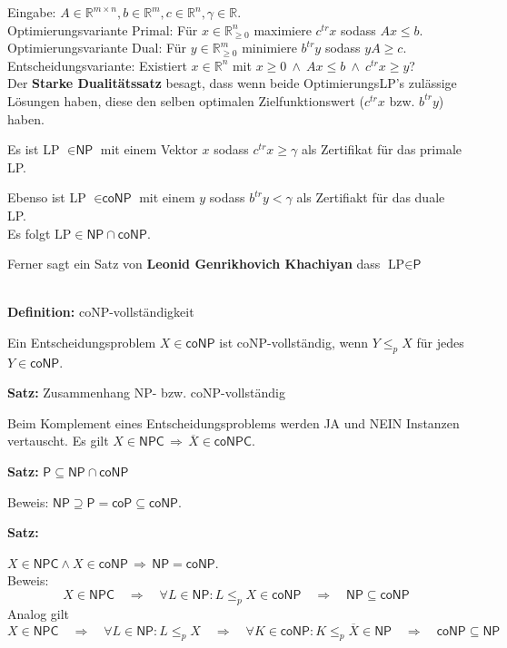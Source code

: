 \documentclass[a4paper,graphics,11pt]{article}
\begin{document}
Eingabe: $A \in \mathbb{R}^{m \times n}, b \in \mathbb{R}^m, c \in \mathbb{R}^n, \gamma \in \mathbb{R}$.
\\[10pt]
Optimierungsvariante Primal: Für $x \in \mathbb{R}^n_{\geq 0}$ maximiere $c^{tr}x$ sodass $Ax \leq b$.
\\[10pt]
Optimierungsvariante Dual: Für $y \in \mathbb{R}^m_{\geq 0}$ minimiere $b^{tr}y$ sodass $yA \geq c$.
\\[10pt]
Entscheidungsvariante: Existiert $x \in \mathbb{R}^n$ mit $x \geq 0\ \land\ Ax \leq b\ \land\ c^{tr}x \geq y$?
\\[30pt]
Der \textbf{Starke Dualitätssatz} besagt, dass wenn beide OptimierungsLP's zulässige Lösungen haben,
diese den selben optimalen Zielfunktionswert ($c^{tr}x$ bzw. $b^{tr}y$) haben.

Es ist LP $\in \textsf{NP}$ mit einem Vektor $x$ sodass $c^{tr}x \geq \gamma$ als Zertifikat für das primale LP.

Ebenso ist LP $\in \textsf{coNP}$ mit einem $y$ sodass $b^{tr}y < \gamma$ als Zertifiakt für das duale LP.
\\[30pt]
Es folgt $\text{LP} \in \textsf{NP} \cap \textsf{coNP}$.

Ferner sagt ein Satz von \textbf{Leonid Genrikhovich Khachiyan} dass $\text{LP} \in \textsf{P}$

\strut\\

\textbf{Definition:} \textsf{coNP}-vollständigkeit

Ein Entscheidungsproblem $X \in \textsf{coNP}$ ist \textsf{coNP}-vollständig, wenn $Y \leq_p X$ für jedes
$Y \in \textsf{coNP}$.

\strut

\textbf{Satz:} Zusammenhang \textsf{NP}- bzw. \textsf{coNP}-vollständig

Beim Komplement eines Entscheidungsproblems werden JA und NEIN Instanzen vertauscht.
Es gilt $X \in \textsf{NPC} \,\Longrightarrow\, \overline{X} \in \textsf{coNPC}$.

\strut

\textbf{Satz:} $\textsf{P} \subseteq \textsf{NP} \cap \textsf{coNP}$

Beweis: $\textsf{NP} \supseteq \textsf{P} = \textsf{coP} \subseteq \textsf{coNP}$.

\strut

\textbf{Satz:}

$X \in \textsf{NPC} \land X \in \textsf{coNP} \,\Longrightarrow\, \textsf{NP} = \textsf{coNP}$.\\
Beweis:
$$
    X \in \textsf{NPC}
    \quad \Longrightarrow\quad \forall L \in \textsf{NP}: L \leq_p X \in \textsf{coNP}
    \quad \Longrightarrow\quad \textsf{NP} \subseteq \textsf{coNP}
$$
Analog gilt
$$
    X \in \textsf{NPC}
    \quad \Longrightarrow\quad  \forall L \in \textsf{NP}: L \leq_p X
    \quad \Longrightarrow\quad  \forall K \in \textsf{coNP}: K \leq_p \overline{X} \in \textsf{NP}
    \quad \Longrightarrow\quad  \textsf{coNP} \subseteq \textsf{NP}
$$
\end{document}
